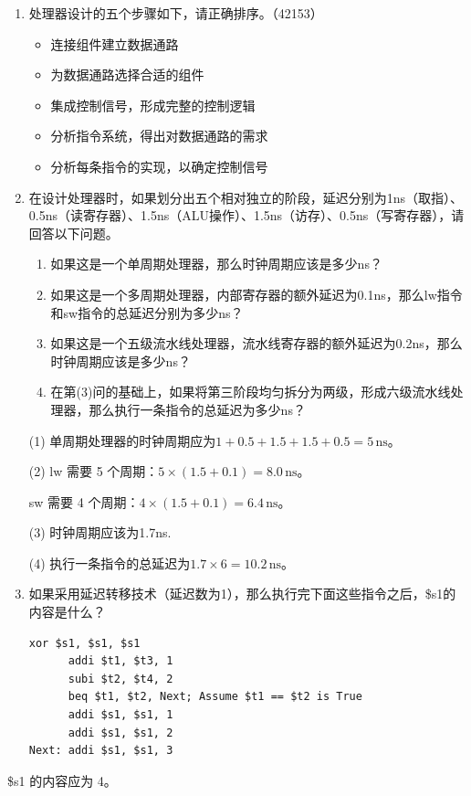 \documentclass[12pt, a4paper]{article}
\begin{document}
\begin{enumerate}[label=\arabic*.]
    
    \item 处理器设计的五个步骤如下，请正确排序。（42153）
    \begin{itemize}
        \item[1.] 连接组件建立数据通路
        \item[2.] 为数据通路选择合适的组件
        \item[3.] 集成控制信号，形成完整的控制逻辑
        \item[4.] 分析指令系统，得出对数据通路的需求
        \item[5.] 分析每条指令的实现，以确定控制信号
    \end{itemize}

    \vspace{1em}
    \item 在设计处理器时，如果划分出五个相对独立的阶段，延迟分别为1ns（取指）、0.5ns（读寄存器）、1.5ns（ALU操作）、1.5ns（访存）、0.5ns（写寄存器），请回答以下问题。
    \begin{enumerate}[label=(\arabic*)]
        \item 如果这是一个单周期处理器，那么时钟周期应该是多少ns？
        \item 如果这是一个多周期处理器，内部寄存器的额外延迟为0.1ns，那么lw指令和sw指令的总延迟分别为多少ns？
        \item 如果这是一个五级流水线处理器，流水线寄存器的额外延迟为0.2ns，那么时钟周期应该是多少ns？
        \item 在第(3)问的基础上，如果将第三阶段均匀拆分为两级，形成六级流水线处理器，那么执行一条指令的总延迟为多少ns？
    \end{enumerate}

    (1) 单周期处理器的时钟周期应为$1 + 0.5 + 1.5 + 1.5 + 0.5 = 5\,\text{ns}$。

    (2) lw 需要 5 个周期：$5\times(1.5+0.1)=8.0\,\text{ns}$。
        
        sw 需要 4 个周期：$4\times(1.5+0.1)=6.4\,\text{ns}$。

    (3) 时钟周期应该为1.7ns.

    (4) 执行一条指令的总延迟为$1.7 \times 6 = 10.2\,\text{ns}$。


    \vspace{1em}
    \item 如果采用延迟转移技术（延迟数为1），那么执行完下面这些指令之后，\$s1的内容是什么？
    \begin{center}
    \begin{BVerbatim}[frame=single, framesep=3mm]
      xor $s1, $s1, $s1 
      addi $t1, $t3, 1 
      subi $t2, $t4, 2 
      beq $t1, $t2, Next; Assume $t1 == $t2 is True 
      addi $s1, $s1, 1 
      addi $s1, $s1, 2 
Next: addi $s1, $s1, 3
    \end{BVerbatim}
    \end{center}

\end{enumerate}

\$s1 的内容应为 4。
\end{document}
